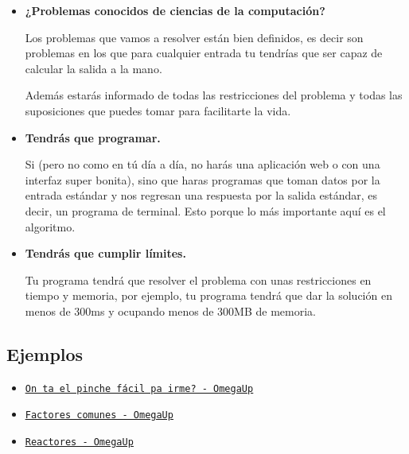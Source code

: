 \documentclass[12pt, fleqn]{report}                             %
\newcommand \Link[2] {\underline{\textCode{\href{#1}{#2}}}}       %
\theoremstyle{break}                                            %
\newcommand{\textCode}[1]  { \texttt{#1} }                      %
\begin{document}
            \begin{itemize}
                \item \textbf{¿Problemas conocidos de ciencias de la computación?}
                
                    Los problemas que vamos a resolver están bien definidos, es decir son problemas
                    en los que para cualquier entrada tu tendrías que ser capaz de calcular la salida
                    a la mano.

                    Además estarás informado de todas las restricciones del problema y todas las 
                    suposiciones que puedes tomar para facilitarte la vida.

                \item \textbf{Tendrás que programar.}
                
                    Si (pero no como en tú día a día, no harás una aplicación web o con una interfaz
                    super bonita), sino que haras programas que toman datos por la entrada estándar
                    y nos regresan una respuesta por la salida estándar, es decir, un programa 
                    de terminal. Esto porque lo más importante aquí es el algoritmo.

                \item \textbf{Tendrás que cumplir límites.}
                
                    Tu programa tendrá que resolver el problema con unas restricciones
                    en tiempo y memoria, por ejemplo, tu programa tendrá que dar la
                    solución en menos de 300ms y ocupando menos de 300MB de memoria.

            \end{itemize}

            \subsection{Ejemplos}

                \begin{itemize}
                    \item 
                        \Link{https://omegaup.com/arena/problem/On-ta-el-pinche-facil-pa-irme}
                        {On ta el pinche fácil pa irme? -  OmegaUp}
                    \item 
                        \Link{https://omegaup.com/arena/problem/factorescomunes}
                        {Factores comunes - OmegaUp}
                    \item 
                        \Link{https://omegaup.com/arena/problem/Reactores}
                        {Reactores - OmegaUp}
                \end{itemize}
\end{document}
